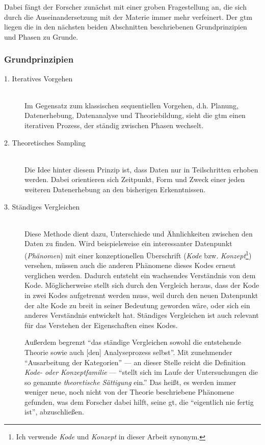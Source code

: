 Dabei fängt der Forscher zunächst mit einer groben Fragestellung an, die sich durch die Auseinandersetzung mit der Materie immer mehr verfeinert. Der \gls{gtm} liegen die in den nächsten beiden Abschnitten beschriebenen Grundprinzipien und Phasen zu Grunde.


\subsubsection{Grundprinzipien}

\begin{description}
  \item[1. Iteratives Vorgehen] \hfill \\
    Im Gegensatz zum klassischen sequentiellen Vorgehen, d.h. Planung, Datenerhebung, Datenanalyse und Theoriebildung, sieht die \gls{gtm} einen iterativen Prozess, der ständig zwischen Phasen wechselt.
    
  \item[2. Theoretisches Sampling] \hfill \\
  Die Idee hinter diesem Prinzip ist, dass Daten nur in Teilschritten erhoben werden. Dabei orientieren sich Zeitpunkt, Form und Zweck einer jeden weiteren Datenerhebung an den bisherigen Erkenntnissen.
  
  \item[3. Ständiges Vergleichen] \hfill \\
  Diese Methode dient dazu, Unterschiede und Ähnlichkeiten zwischen den Daten zu finden. Wird beispielsweise ein interessanter Datenpunkt (\textit{Phänomen}) mit einer konzeptionellen Überschrift (\textit{Kode} bzw. \textit{Konzept}\footnote{Ich verwende \textit{Kode} und \textit{Konzept} in dieser Arbeit synonym.}) versehen, müssen auch die anderen Phänomene dieses Kodes erneut verglichen werden. Dadurch entsteht ein wachsendes Verständnis von dem Kode. Möglicherweise stellt sich durch den Vergleich heraus, dass der Kode in zwei Kodes aufgetrennt werden muss, weil durch den neuen Datenpunkt der alte Kode zu breit in seiner Bedeutung geworden wäre, oder sich ein anderes Verständnis entwickelt hat. Ständiges Vergleichen ist auch relevant für das Verstehen der Eigenschaften eines Kodes.
  
  Außerdem begrenzt ``das ständige Vergleichen sowohl die entstehende Theorie sowie auch [den] Analyseprozess selbst''. Mit zunehmender ``Ausarbeitung der Kategorien'' --- an dieser Stelle reicht die Definition \textit{Kode- oder Konzeptfamilie} --- ``stellt sich im Laufe der Untersuchungen die so genannte \textit{theoretische Sättigung} ein.'' Das heißt, es werden immer weniger neue, noch nicht von der Theorie beschriebene Phänomene gefunden, was dem Forscher dabei hilft, seine \gls{gt}, die ``eigentlich nie fertig ist'', abzuschließen. 
  

\end{description}
